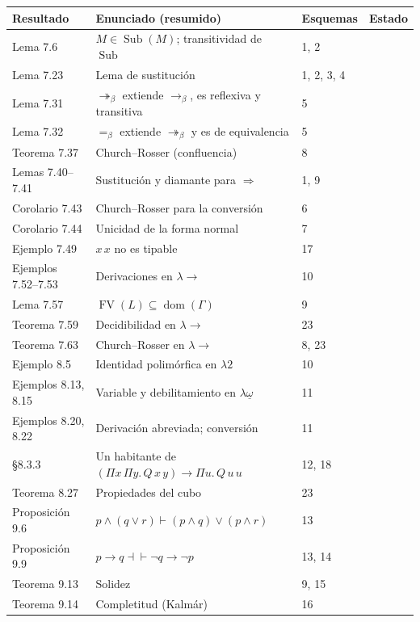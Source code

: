 \documentclass[11pt,a4paper]{article}
\newcommand{\etiqueta}[2]{\tcbox[on line, boxsep=0pt, left=3pt, right=3pt,
  top=1pt, bottom=1pt, colback=#1!12, colframe=#1, boxrule=0.4pt,
  arc=2pt]{\sffamily\scriptsize #2}}
\newcommand{\dem}{\etiqueta{okverde}{demostrado}}
\newcommand{\esb}{\etiqueta{esbozo}{esbozado}}
\newcommand{\cit}{\etiqueta{cita}{citado}}
\newcommand{\enu}{\etiqueta{cita}{enunciado}}
\newcommand{\Sub}{\operatorname{Sub}}
\newcommand{\FV}{\operatorname{FV}}
\newcommand{\dom}{\operatorname{dom}}
\newcommand{\bred}{\rightarrow_\beta}
\newcommand{\bmred}{\twoheadrightarrow_\beta}
\newcommand{\beq}{=_\beta}
\newcommand{\pr}{\Rightarrow}
\begin{document}
{\small
\begin{longtable}{@{}p{}p{}p{}p{}@{}}
\toprule
\textbf{Resultado} & \textbf{Enunciado (resumido)} & \textbf{Esquemas} & \textbf{Estado}\\
\midrule
\endhead
Lema 7.6 & \(M\in\Sub(M)\); transitividad de \(\Sub\) & 1, 2 & \dem\\
Lema 7.23 & Lema de sustitución & 1, 2, 3, 4 & \dem\\
Lema 7.31 & \(\bmred\) extiende \(\bred\), es reflexiva y transitiva & 5 & \dem\\
Lema 7.32 & \(\beq\) extiende \(\bmred\) y es de equivalencia & 5 & \dem\\
Teorema 7.37 & Church--Rosser (confluencia) & 8 & \esb\\
Lemas 7.40--7.41 & Sustitución y diamante para \(\pr\) & 1, 9 & \enu\\
Corolario 7.43 & Church--Rosser para la conversión & 6 & \dem\\
Corolario 7.44 & Unicidad de la forma normal & 7 & \dem\\
Ejemplo 7.49 & \(x\,x\) no es tipable & 17 & \dem\\
Ejemplos 7.52--7.53 & Derivaciones en \(\lambda\!\to\) & 10 & \dem\\
Lema 7.57 & \(\FV(L)\subseteq\dom(\Gamma)\) & 9 & \dem\\
Teorema 7.59 & Decidibilidad en \(\lambda\!\to\) & 23 & \cit\\
Teorema 7.63 & Church--Rosser en \(\lambda\!\to\) & 8, 23 & \cit\\
Ejemplo 8.5 & Identidad polimórfica en \(\lambda2\) & 10 & \dem\\
Ejemplos 8.13, 8.15 & Variable y debilitamiento en \(\lambda\underline{\omega}\) & 11 & \dem\\
Ejemplos 8.20, 8.22 & Derivación abreviada; conversión & 11 & \dem\\
§8.3.3 & Un habitante de \((\Pi x\,\Pi y.\,Q\,x\,y)\to\Pi u.\,Q\,u\,u\) & 12, 18 & \dem\\
Teorema 8.27 & Propiedades del cubo & 23 & \cit\\
Proposición 9.6 & \(p\wedge(q\vee r)\vdash(p\wedge q)\vee(p\wedge r)\) & 13 & \dem\\
Proposición 9.9 & \(p\to q\dashv\vdash\neg q\to\neg p\) & 13, 14 & \dem\\
Teorema 9.13 & Solidez & 9, 15 & \esb\\
Teorema 9.14 & Completitud (Kalmár) & 16 & \esb\\

\end{longtable}}
\end{document}
